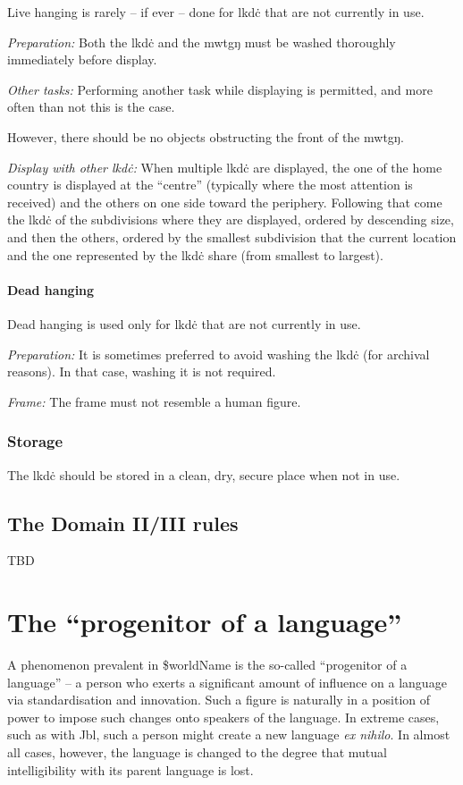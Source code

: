 \documentclass{book}
\newcommand{\wname}{\$worldName}
\begin{document}
Live hanging is rarely -- if ever -- done for lkdċ that are not currently in use.

\emph{Preparation:} Both the lkdċ and the mwtgŋ must be washed thoroughly immediately before display.

\emph{Other tasks:} Performing another task while displaying is permitted, and more often than not this is the case.

However, there should be no objects obstructing the front of the mwtgŋ.

\emph{Display with other lkdċ:} When multiple lkdċ are displayed, the one of the home country is displayed at the ``centre'' (typically where the most attention is received) and the others on one side toward the periphery. Following that come the lkdċ of the subdivisions where they are displayed, ordered by descending size, and then the others, ordered by the smallest subdivision that the current location and the one represented by the lkdċ share (from smallest to largest).

\subsubsection{Dead hanging}

Dead hanging is used only for lkdċ that are not currently in use.

\emph{Preparation:} It is sometimes preferred to avoid washing the lkdċ (for archival reasons). In that case, washing it is not required.

\emph{Frame:} The frame must not resemble a human figure.

\subsection{Storage}

The lkdċ should be stored in a clean, dry, secure place when not in use.

\section{The Domain II/III rules}

TBD

\chapter{The ``progenitor of a language''}

A phenomenon prevalent in \wname{} is the so-called ``progenitor of a language'' -- a person who exerts a significant amount of influence on a language via standardisation and innovation. Such a figure is naturally in a position of power to impose such changes onto speakers of the language. In extreme cases, such as with Jbl, such a person might create a new language \emph{ex nihilo}. In almost all cases, however, the language is changed to the degree that mutual intelligibility with its parent language is lost.
\end{document}

